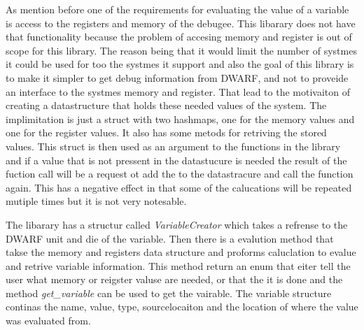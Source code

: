 As mention before one of the requirements for evaluating the value of a variable is access to the registers and memory of the debugee.
This libarary does not have that functionality because the problem of accesing memory and register is out of scope for this library.
The reason being that it would limit the number of systmes it could be used for too the systmes it support and also the goal of this library is to make it simpler to get debug information from \gls{DWARF}, and not to proveide an interface to the systmes memory and register.
That lead to the motivaiton of creating a datastructure that holds these needed values of the system.
The implimitation is just a struct with two hashmaps, one for the memory values and one for the register values.
It also has some metods for retriving the stored values.
This struct is then used as an argument to the functions in the library and if a value that is not pressent in the datastucure is needed the result of the fuction call will be a request ot add the to the datastracure and call the function again.
This has a negative effect in that some of the calucations will be repeated mutiple times but it is not very notesable.


The libarary has a structur called \emph{VariableCreator} which  takes a refrense to the \gls{DWARF} unit and die of the variable.
Then there is a evalution method that takse the memory and registers data structure and proforms caluclation to evalue and retrive variable information.
This method return an enum that eiter tell the user what memory or reigster valuse are needed, or that the it is done and the method \emph{get\_variable} can be used to get the vairable.
The variable structure continas the name, value, type, sourcelocaiton and the location of where the value was evaluated from.


